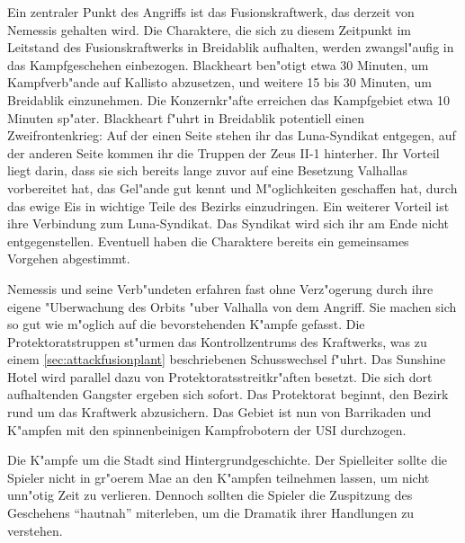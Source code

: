 Ein zentraler Punkt des Angriffs ist das Fusionskraftwerk, das derzeit von Nemessis gehalten wird. Die Charaktere, die sich zu diesem Zeitpunkt im Leitstand des Fusionskraftwerks in Breidablik aufhalten, werden zwangsl"aufig in das Kampfgeschehen einbezogen. Blackheart ben"otigt etwa 30 Minuten, um Kampfverb"ande auf Kallisto abzusetzen, und weitere 15 bis 30 Minuten, um Breidablik einzunehmen. Die Konzernkr"afte erreichen das Kampfgebiet etwa 10 Minuten sp"ater. Blackheart f"uhrt in Breidablik potentiell einen Zweifrontenkrieg: Auf der einen Seite stehen ihr das Luna-Syndikat entgegen, auf der anderen Seite kommen ihr die Truppen der Zeus II-1 hinterher. Ihr Vorteil liegt darin, dass sie sich bereits lange zuvor auf eine Besetzung Valhallas vorbereitet hat, das Gel"ande gut kennt und M"oglichkeiten geschaffen hat, durch das ewige Eis in wichtige Teile des Bezirks einzudringen. Ein weiterer Vorteil ist ihre Verbindung zum Luna-Syndikat. Das Syndikat wird sich ihr am Ende nicht entgegenstellen. Eventuell haben die Charaktere bereits ein gemeinsames Vorgehen abgestimmt.

Nemessis und seine Verb"undeten erfahren fast ohne Verz"ogerung durch ihre eigene "Uberwachung des Orbits "uber Valhalla von dem Angriff. Sie machen sich so gut wie m"oglich auf die bevorstehenden K"ampfe gefasst. Die Protektoratstruppen st"urmen das Kontrollzentrums des Kraftwerks, was zu einem \cref{sec:attackfusionplant} beschriebenen Schusswechsel f"uhrt. Das Sunshine Hotel wird parallel dazu von Protektoratsstreitkr"aften besetzt. Die sich dort aufhaltenden Gangster ergeben sich sofort. Das Protektorat beginnt, den Bezirk rund um das Kraftwerk abzusichern. Das Gebiet ist nun von Barrikaden und K"ampfen mit den spinnenbeinigen Kampfrobotern der USI durchzogen.

\begin{remarks}
	Die K"ampfe um die Stadt sind Hintergrundgeschichte. Der Spielleiter sollte die Spieler nicht in gr"o\3erem Ma\3e an den K"ampfen teilnehmen lassen, um nicht unn"otig Zeit zu verlieren. Dennoch sollten die Spieler die Zuspitzung des Geschehens "`hautnah"' miterleben, um die Dramatik ihrer Handlungen zu verstehen.
 \end{remarks}
